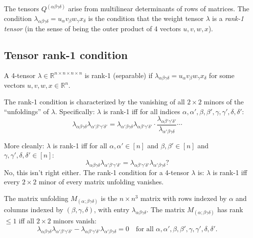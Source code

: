 \documentclass[12pt]{article}
\begin{document}
The tensors $Q^{(\alpha\beta\gamma\delta)}$ arise from multilinear determinants of rows of matrices. The condition $\lambda_{\alpha\beta\gamma\delta} = u_\alpha v_\beta w_\gamma x_\delta$ is the condition that the weight tensor $\lambda$ is a \emph{rank-1 tensor} (in the sense of being the outer product of 4 vectors $u, v, w, x$).

\subsection{Tensor rank-1 condition}

A 4-tensor $\lambda \in \mathbb{R}^{n \times n \times n \times n}$ is rank-1 (separable) if $\lambda_{\alpha\beta\gamma\delta} = u_\alpha v_\beta w_\gamma x_\delta$ for some vectors $u, v, w, x \in \mathbb{R}^n$.

The rank-1 condition is characterized by the vanishing of all $2 \times 2$ minors of the ``unfoldings'' of $\lambda$. Specifically: $\lambda$ is rank-1 iff for all indices $\alpha, \alpha', \beta, \beta', \gamma, \gamma', \delta, \delta'$:
\begin{equation}\label{eq:rank1}
\lambda_{\alpha\beta\gamma\delta} \lambda_{\alpha'\beta'\gamma'\delta'} = \lambda_{\alpha'\beta\gamma\delta} \lambda_{\alpha\beta'\gamma'\delta'} \cdot \frac{\lambda_{\alpha\beta'\gamma'\delta'}}{\lambda_{\alpha'\beta\gamma\delta}} \cdots
\end{equation}

More cleanly: $\lambda$ is rank-1 iff for all $\alpha, \alpha' \in [n]$ and $\beta,\beta' \in [n]$ and $\gamma,\gamma',\delta,\delta' \in [n]$:
\begin{equation}\label{eq:rank1-2x2}
\lambda_{\alpha\beta\gamma\delta} \lambda_{\alpha'\beta'\gamma'\delta'} = \lambda_{\alpha\beta'\gamma'\delta'} \lambda_{\alpha'\beta\gamma\delta}?
\end{equation}
No, this isn't right either. The rank-1 condition for a 4-tensor $\lambda$ is: $\lambda$ is rank-1 iff every $2 \times 2$ minor of every matrix unfolding vanishes.

The matrix unfolding $M_{(\alpha;\beta\gamma\delta)}$ is the $n \times n^3$ matrix with rows indexed by $\alpha$ and columns indexed by $(\beta,\gamma,\delta)$, with entry $\lambda_{\alpha\beta\gamma\delta}$. The matrix $M_{(\alpha;\beta\gamma\delta)}$ has rank $\leq 1$ iff all $2\times 2$ minors vanish:
\[
\lambda_{\alpha\beta\gamma\delta}\lambda_{\alpha'\beta'\gamma'\delta'} - \lambda_{\alpha\beta'\gamma'\delta'}\lambda_{\alpha'\beta\gamma\delta} = 0 \quad \text{for all } \alpha,\alpha',\beta,\beta',\gamma,\gamma',\delta,\delta'.
\]
\end{document}
